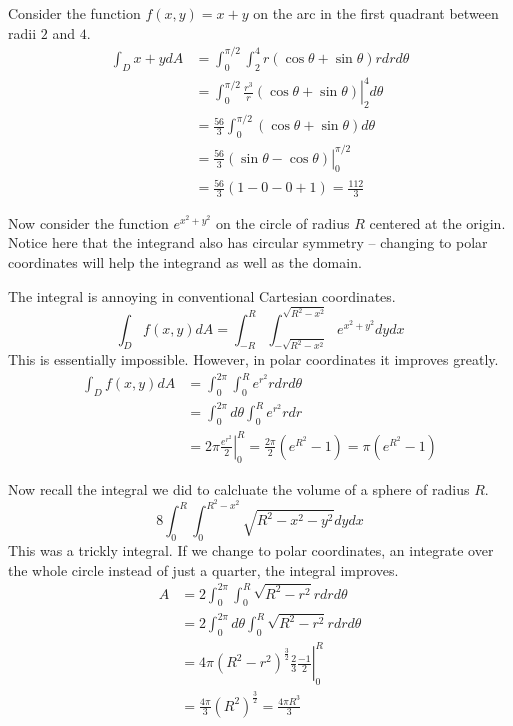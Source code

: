 \documentclass[fleqn,letterpaper]{report}
\begin{document}
\begin{example}
Consider the function $f(x,y) = x + y$ on the
arc in the first quadrant between radii $2$ and $4$. 
\begin{align*}
\int_D x + y dA & = \int_0^{\pi/2} \int_2^4 r (\cos \theta +
\sin \theta) r dr d\theta \\
& = \int_0^{\pi/2} \left. \frac{r^3}{r} (\cos \theta + \sin
\theta) \right|_2^4 d\theta \\
& = \frac{56}{3} \int_0^{\pi/2} (\cos \theta + \sin \theta) d
\theta \\
& = \left. \frac{56}{3} (\sin \theta - \cos \theta)
\right|_0^{\pi/2} \\
& = \frac{56}{3} (1 - 0 - 0 + 1) = \frac{112}{3} 
\end{align*}
\end{example}

\begin{example}
Now consider the function $e^{x^2 + y^2}$ on the circle of
radius $R$ centered at the origin. Notice here that the
integrand also has circular symmetry -- changing to polar
coordinates will help the integrand as well as the domain.

The integral is annoying in conventional Cartesian
coordinates.
\begin{equation*}
\int_D f(x,y) dA = \int_{-R}^R \int_{-\sqrt{R^2 -
x^2}}^{\sqrt{R^2 - x^2}} e^{x^2 + y^2} dy dx
\end{equation*}
This is essentially impossible. However, in polar coordinates
it improves greatly.
\begin{align*}
\int_D f(x,y) dA & = \int_0^{2\pi} \int_0^R e^{r^2} r dr
d\theta \\
& = \int_0^{2\pi} d\theta \int_0^R e^{r^2} r dr \\
& = 2\pi \left. \frac{e^{r^2}}{2} \right|_0^R = \frac{2\pi}{2}
(e^{R^2} - 1) = \pi (e^{R^2} - 1)
\end{align*}
\end{example}

\begin{example}
Now recall the integral we did to calcluate the volume of a
sphere of radius $R$.
\begin{equation*}
8 \int_0^{R} \int_0^{R^2 - x^2} \sqrt{R^2 - x^2 - y^2} dy dx 
\end{equation*}
This was a trickly integral. If we change to polar
coordinates, an integrate over the whole circle instead of
just a quarter, the integral improves.
\begin{align*}
A & = 2 \int_0^{2\pi} \int_0^R \sqrt{R^2 - r^2} r dr d\theta \\
& = 2 \int_0^{2\pi} d\theta \int_0^R \sqrt{R^2 - r^2} r dr
d\theta \\
& = 4\pi \left. (R^2 - r^2)^{\frac{3}{2}} \frac{2}{3}
\frac{-1}{2} \right|_0^R \\
& = \frac{4\pi}{3} (R^2)^{\frac{3}{2}} = \frac{4\pi R^3}{3}
\end{align*}
\end{example}
\end{document}
